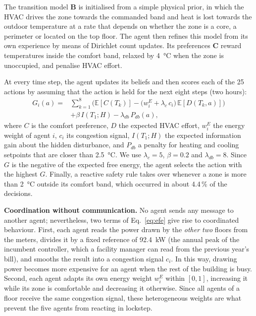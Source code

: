 \documentclass[conference]{IEEEtran}
\begin{document}
The transition model $\mathbf{B}$ is initialised from a simple physical prior,
in which the HVAC drives the zone towards the commanded band and heat is lost
towards the outdoor temperature at a rate that depends on whether the zone is a
core, a perimeter or located on the top floor. The agent then refines this
model from its own experience by means of Dirichlet count updates. Its
preferences $\mathbf{C}$ reward temperatures inside the comfort band, relaxed
by \SI{4}{\celsius} when the zone is unoccupied, and penalise HVAC effort.

At every time step, the agent updates its beliefs and then scores each of the
25 actions by assuming that the action is held for the next eight steps (two
hours):
\begin{equation}
\begin{aligned}
G_i(a) = {} & \sum_{k=1}^{8} \Big( \mathbb{E}[C(T_k)]
  - \big(w^E_i + \lambda_c\, c_i\big)\,\mathbb{E}[D(T_k,a)] \Big) \\
  & + \beta\, I(T_1;H) - \lambda_{db}\, P_{db}(a),
\end{aligned}
\label{eq:efe}
\end{equation}
where $C$ is the comfort preference, $D$ the expected HVAC effort, $w^E_i$ the
energy weight of agent $i$, $c_i$ its congestion signal, $I(T_1;H)$ the
expected information gain about the hidden disturbance, and $P_{db}$ a penalty
for heating and cooling setpoints that are closer than \SI{2.5}{\celsius}. We
use $\lambda_c = 5$, $\beta = 0.2$ and $\lambda_{db} = 8$. Since $G$ is the
negative of the expected free energy, the agent selects the action with the
highest $G$. Finally, a reactive safety rule takes over whenever a zone is more
than \SI{2}{\celsius} outside its comfort band, which occurred in about
4.4\,\% of the decisions.

\textbf{Coordination without communication.} No agent sends any message to
another agent; nevertheless, two terms of Eq.~\eqref{eq:efe} give rise to
coordinated behaviour. First, each agent reads the power drawn by the
\emph{other two} floors from the meters, divides it by a fixed reference of
\SI{92.4}{\kilo\watt} (the annual peak of the incumbent controller, which a
facility manager can read from the previous year's bill), and smooths the
result into a congestion signal $c_i$. In this way, drawing power becomes more
expensive for an agent when the rest of the building is busy. Second, each
agent adapts its own energy weight $w^E_i$ within $[0,1]$, increasing it while
its zone is comfortable and decreasing it otherwise. Since all agents of a
floor receive the same congestion signal, these heterogeneous weights are what
prevent the five agents from reacting in lockstep.
\end{document}
